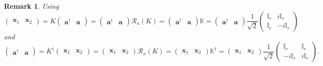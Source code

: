 \documentclass[aps,preprint]{revtex4}
\newtheorem{remark}[theorem]{Remark}
\begin{document}
\begin{remark}
Using 
\begin{equation}
\left( 
\begin{array}{cc}
\boldsymbol{x}_{1} & \boldsymbol{x}_{2}%
\end{array}%
\right) =K\left( 
\begin{array}{cc}
\boldsymbol{a}^{\dagger } & \boldsymbol{a}%
\end{array}%
\right) =\left( 
\begin{array}{cc}
\boldsymbol{a}^{\dagger } & \boldsymbol{a}%
\end{array}%
\right) \mathcal{R}_{a}\left( K\right) =\left( 
\begin{array}{cc}
\boldsymbol{a}^{\dagger } & \boldsymbol{a}%
\end{array}%
\right) \mathbb{K}=\left( 
\begin{array}{cc}
\boldsymbol{a}^{\dagger } & \boldsymbol{a}%
\end{array}%
\right) \frac{1}{\sqrt{2}}\left( 
\begin{array}{cc}
\mathbb{I}_{r} & i\mathbb{I}_{r} \\ 
\mathbb{I}_{r} & -i\mathbb{I}_{r}%
\end{array}%
\right)
\end{equation}%
and 
\begin{equation}
\left( 
\begin{array}{cc}
\boldsymbol{a}^{\dagger } & \boldsymbol{a}%
\end{array}%
\right) =K^{\dagger }\left( 
\begin{array}{cc}
\boldsymbol{x}_{1} & \boldsymbol{x}_{2}%
\end{array}%
\right) =\left( 
\begin{array}{cc}
\boldsymbol{x}_{1} & \boldsymbol{x}_{2}%
\end{array}%
\right) \mathcal{R}_{x}\left( K\right) =\left( 
\begin{array}{cc}
\boldsymbol{x}_{1} & \boldsymbol{x}_{2}%
\end{array}%
\right) \mathbb{K}^{\dagger }=\left( 
\begin{array}{cc}
\boldsymbol{x}_{1} & \boldsymbol{x}_{2}%
\end{array}%
\right) \frac{1}{\sqrt{2}}\left( 
\begin{array}{cc}
\mathbb{I}_{r} & \mathbb{I}_{r} \\ 
-i\mathbb{I}_{r} & i\mathbb{I}_{r}%
\end{array}%
\right) .
\end{equation}
\end{remark}
\end{document}
